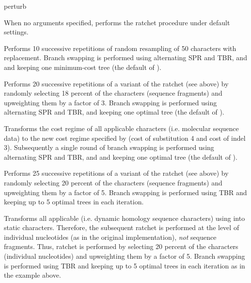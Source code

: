 \begin{command}{perturb}{}
\begin{arguments}
	\end{arguments}

        {When no arguments specified, \poy performs the ratchet procedure under
        default settings.}
	
	\begin{poyexamples}
	
        	{Performs 10 successive repetitions of random resampling of 50
            characters with replacement. Branch swapping is performed
            using alternating SPR and TBR, and and keeping one minimum-cost tree
            (the default of ).}
	
            {Performs 20 successive repetitions of a variant of the ratchet (see
            above) by randomly selecting 18 percent of the characters (sequence
            fragments) and upweighting them by a factor of 3. Branch swapping is
            performed using alternating SPR and TBR, and keeping one
            optimal tree (the default of ).}

            {Transforms the cost regime of all applicable characters (i.e.
            molecular sequence data) to the new cost regime specified by
             (cost of substitution 4 and cost of indel 3).
            Subsequently a single round of branch swapping is
            performed using alternating SPR and TBR, and and keeping one
            optimal tree (the default of ).}
            
            {Performs 25 successive repetitions of a variant of the ratchet (see
            above) by randomly selecting 20 percent of the characters (sequence
            fragments) and upweighting them by a factor of 5. Branch swapping is
            performed using TBR and keeping up to 5 optimal trees in each iteration.}
            
            {Transforms all applicable (i.e. dynamic homology sequence
            characters) using  into static characters.
            Therefore, the subsequent ratchet is performed at the level of
            individual nucleotides (as in the original implementation),
            \emph{not} sequence fragments. Thus, ratchet is performed by
            selecting 20 percent of the characters (individual nucleotides) and
            upweighting them by a factor of 5.  Branch swapping is performed
            using TBR and keeping up to 5 optimal trees in each iteration as in
            the example above.}


\end{poyexamples}
\end{command}
